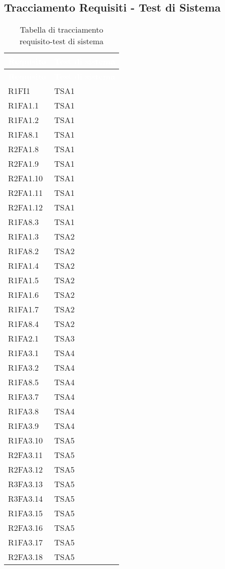 \subsection{Tracciamento Requisiti - Test di Sistema}
{
\renewcommand{\arraystretch}{1.5}
\centering
\begin{longtable}{C{4cm} C{4cm}}
\caption{Tabella di tracciamento requisito-test di sistema}\\
\textcolor{white}{\textbf{Requisito}} & \textcolor{white}{\textbf{Test di sistema}}\\	
\endfirsthead
{}
\textcolor{white}{\textbf{Requisito}} & \textcolor{white}{\textbf{Test di sistema}}\\	
\endhead

R1FI1 & TSA1  \\
R1FA1.1 & TSA1  \\
R1FA1.2 & TSA1  \\
R1FA8.1 & TSA1  \\
R2FA1.8 & TSA1  \\
R2FA1.9 & TSA1  \\
R2FA1.10 & TSA1  \\
R2FA1.11 & TSA1  \\ 
R2FA1.12 & TSA1  \\ 
R1FA8.3 & TSA1  \\

R1FA1.3 & TSA2  \\
R1FA8.2 & TSA2  \\
R1FA1.4 & TSA2  \\
R1FA1.5 & TSA2  \\
R1FA1.6 & TSA2  \\
R1FA1.7 & TSA2  \\
R1FA8.4 & TSA2  \\

R1FA2.1 & TSA3  \\

R1FA3.1 & TSA4  \\
R1FA3.2 & TSA4  \\
R1FA8.5 & TSA4  \\
R1FA3.7 & TSA4  \\
R1FA3.8 & TSA4  \\
R1FA3.9 & TSA4  \\

R1FA3.10 & TSA5  \\
R2FA3.11 & TSA5  \\
R2FA3.12 & TSA5  \\
R3FA3.13 & TSA5  \\
R3FA3.14 & TSA5  \\
R1FA3.15 & TSA5  \\
R2FA3.16 & TSA5  \\
R1FA3.17 & TSA5  \\
R2FA3.18 & TSA5  \\


\end{longtable}}
